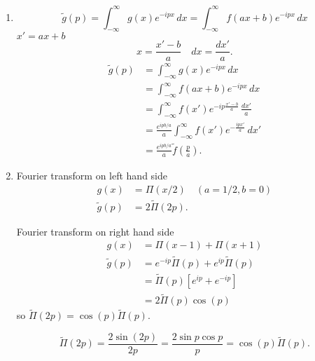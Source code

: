 \documentclass[10pt, a4paper]{article}
\begin{document}
\begin{problem}[Resit $2020$]
\begin{solution}
\begin{enumerate}[label = (\alph*)]
            \item
            \[
            \tilde{g}(p) = \int_{-\infty}^{\infty}g(x)e ^ {-ipx}\,dx = \int_{-\infty}^{\infty}f(ax + b)e ^ {-ipx}\,dx
            \]
            $x' = ax + b$
            \[
            x = \frac{x' - b}{a}\quad dx = \frac{dx'}{a}.
            \]
            \begin{align*}
                \tilde{g}(p) &= \int_{-\infty}^{\infty}g(x)e ^ {-ipx}\,dx \\
                &= \int_{-\infty}^{\infty}f(ax + b)e ^ {-ipx}\,dx \\
                &= \int_{-\infty}^{\infty}f(x')e ^ {-ip\frac{x' - b}{a}}\,\frac{dx'}{a} \\
                &= \frac{e ^ {ipb / a}}{a}\int_{-\infty}^{\infty}f(x')e ^ {-\frac{ipx'}{a}}\,dx' \\
                &= \frac{e ^ {ipb / a}}{a}\tilde{f}\left(\frac{p}{a}\right).
            \end{align*}

            \item

            Fourier transform on left hand side
            \begin{align*}
                g(x) &= \Pi(x / 2)\quad(a = 1 / 2, b = 0) \\
                \tilde{g}(p) &= 2\tilde{\Pi}(2p).
            \end{align*}

            Fourier transform on right hand side
            \begin{align*}
                g(x) &= \Pi(x - 1) + \Pi(x + 1) \\
                \tilde{g}(p) &= e ^ {-ip}\tilde{\Pi}(p) + e ^ {ip}\tilde{\Pi}(p) \\
                &= \tilde{\Pi}(p)\left[e ^ {ip} + e ^ {-ip}\right] \\
                &= 2\tilde{\Pi}(p)\cos(p)
            \end{align*}
            so $\tilde{\Pi}(2p) = \cos(p)\tilde{\Pi}(p)$.

            \[
            \tilde{\Pi}(2p) = \frac{2\sin(2p)}{2p} = \frac{2\sin{p}\cos{p}}{p} = \cos(p)\tilde{\Pi}(p).
            \]
        \end{enumerate}
    \end{solution}
\end{problem}
\end{document}
